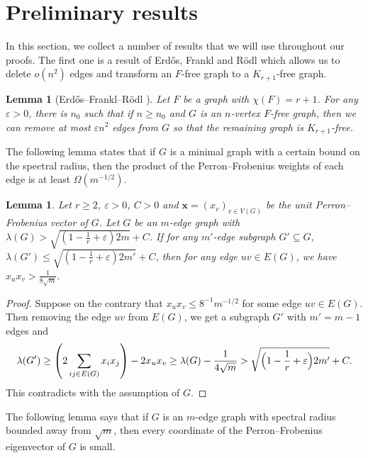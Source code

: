 \documentclass[11pt,a4paper]{article}
\newtheorem{lemma}[theorem]{Lemma}
\theoremstyle{definition}
\theoremstyle{remark}
\begin{document}
\section{Preliminary results}\label{sec:prelim}
In this section, we collect a number of results that we will use throughout our proofs. The first one is a result of  Erd\H{o}s, Frankl and R\"{o}dl \cite{EFR1986} which allows us to delete $o(n^2)$ edges and transform an $F$-free graph to a $K_{r+1}$-free graph. 

\begin{lemma}[Erd\H{o}s--Frankl--R\"{o}dl \cite{EFR1986}] \label{lemEFR}
Let $F$ be a graph with $\chi (F)=r+1$. 
For any $\varepsilon >0$, 
there is $n_0$ such that 
if $n\ge n_0$ and $G$ is an $n$-vertex $F$-free graph, 
then we can remove at most $\varepsilon n^2$ edges from $G$ 
so that the remaining graph is $K_{r+1}$-free.  
\end{lemma}

The following lemma states that if $G$ is a minimal graph with a certain bound on the spectral radius, then the product of the Perron--Frobenius weights of each edge is at least $\Omega (m^{-1/2})$.  

\begin{lemma} \label{lem-product-entry}
Let $r\ge 2$, $\varepsilon>0$, $C>0$ and $\bm{x}=(x_v)_{v\in V(G)}$ be the unit Perron--Frobenius vector of $G$. 
Let $G$ be an $m$-edge graph with 
$  \lambda (G)> \sqrt{(1-\frac{1}{r} + \varepsilon )2m} + C$.  
 If for any $m'$-edge subgraph $G'\subseteq G$, $\lambda(G')\le 
\sqrt{(1-\frac{1}{r} + \varepsilon )2m'} + C$, then for any edge $uv \in E(G)$, we have  $x_ux_v > \frac{1}{8\sqrt{m}}.$
\end{lemma}

\begin{proof}
Suppose on the contrary that $x_ux_v \le 8^{-1}m^{-1/2}$ 
for some edge $uv\in E(G)$.  Then removing the edge 
$uv$ from $E(G)$, we get a subgraph $G'$ with $m'=m-1$ edges and 
\begin{align*}
\lambda (G') \ge  \left(2\sum_{ij \in E(G)} x_ix_j \right) - 2x_ux_v  \ge \lambda (G) - \frac{1}{4\sqrt{m}}  > 
 \sqrt{\Bigl( 1- \frac{1}{r} + 
 \varepsilon \Bigr)2m'} + C. 
 \end{align*}
 This contradicts with the assumption of $G$.  
\end{proof}


The following lemma says that if  $G$ is an $m$-edge graph with spectral radius bounded away from $\sqrt{m}$, then every coordinate of the Perron--Frobenius eigenvector of $G$ is small. 
\end{document}
